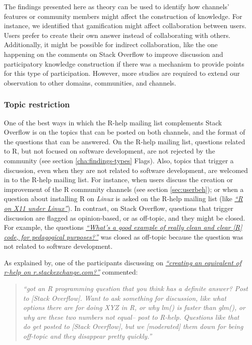 \documentclass{sig-alternate-05-2015}
\begin{document}
	The findings presented here as theory can be used to identify how channels' features or community members might affect the construction of knowledge.
	For instance, we identified that gamification might affect collaboration between users. 
	Users prefer to create their own answer instead of collaborating with others.
	Additionally, it might be possible for indirect collaboration, like the one happening on the comments on Stack Overflow to improve discussion and participatory knowledge construction if there was a mechanism to provide points for this type of participation.
	However, more studies are required to extend our observation to other domains, communities, and channels.


	\subsubsection{Topic restriction}

	One of the best ways in which the R-help mailing list complements Stack Overflow is on the topics that can be posted on both channels, and the format of the questions that can be answered. 
	On the R-help mailing list, questions related to R, but not focused on software development, are not rejected by the community (see section \ref{cha:findings-types} Flags).
	Also, topics that trigger a discussion, even when they are not related to software development, are welcomed in to the R-help mailing list.
	For instance, when users discuss the creation or improvement of the R community channels (see section \ref{sec:userbeh}); or when a question about installing R on \textit{Linux} is asked on the R-help mailing list (like {\href{http://goo.gl/1JLOUF}{\textit{``R on X11 under Linux''}}}).
	In contrast, on Stack Overflow, questions that trigger discussion are flagged as opinion-based, or as off-topic, and they might be closed. 
	For example, the questions \textit{\href{http://goo.gl/9JjZW1}{``What's a good example of really clean and clear [R] code, for pedagogical purposes?''}} was closed as off-topic because the question was not related to software development.


	As explained by, one of the participants discussing on \textit{\href{http://goo.gl/mTccwx}{``creating an equivalent of r-help on r.stackexchange.com?''}} commented:
	\begin{quote}
	    \textit{``got an R programming question that you think has a definite answer? Post to [Stack Overflow]. Want to ask something for discussion, like what options there are for doing XYZ in R, or why lm() is faster than glm(), or why are these two numbers not equal-- post to R-help. Questions like that do get posted to [Stack Overflow], but we [moderated] them down for being off-topic and they disappear pretty quickly.''}
    \end{quote}
\end{document}
